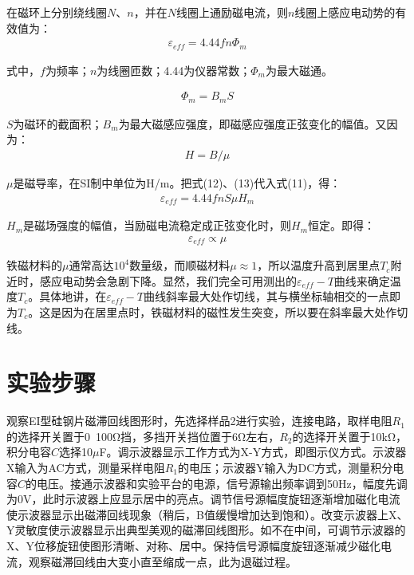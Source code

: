 ﻿\documentclass[12pt,a4paper]{article}
\begin{document}
在磁环上分别绕线圈$N$、$n$，并在$N$线圈上通励磁电流，则$n$线圈上感应电动势的有效值为：
\begin{align}
\varepsilon_{eff} = 4.44fn\Phi_m \tag{11}
\end{align}

式中，$f$为频率；$n$为线圈匝数；4.44为仪器常数；$\Phi_m$为最大磁通。

\begin{align}
\Phi_m = B_mS \tag{12}
\end{align}

$S$为磁环的截面积；$B_m$为最大磁感应强度，即磁感应强度正弦变化的幅值。又因为：
\begin{align}
H = B/\mu \tag{13}
\end{align}

$\mu$是磁导率，在SI制中单位为H/m。把式(12)、(13)代入式(11)，得：
\begin{align}
\varepsilon_{eff} = 4.44fnS\mu H_m \tag{14}
\end{align}

$H_m$是磁场强度的幅值，当励磁电流稳定成正弦变化时，则$H_m$恒定。即得：
\begin{align}
\varepsilon_{eff} \propto \mu \tag{15}
\end{align}

铁磁材料的$\mu$通常高达$10^4$数量级，而顺磁材料$\mu \approx 1$，所以温度升高到居里点$T_c$附近时，感应电动势会急剧下降。显然，我们完全可用测出的$\varepsilon_{eff}-T$曲线来确定温度$T_c$。具体地讲，在$\varepsilon_{eff}-T$曲线斜率最大处作切线，其与横坐标轴相交的一点即为$T_c$。这是因为在居里点时，铁磁材料的磁性发生突变，所以要在斜率最大处作切线。

\section{实验步骤}

观察EI型硅钢片磁滞回线图形时，先选择样品2进行实验，连接电路，取样电阻$R_1$的选择开关置于0~100Ω挡，多挡开关挡位置于6Ω左右，$R_2$的选择开关置于10kΩ，积分电容$C$选择10$\mu$F。调示波器显示工作方式为X-Y方式，即图示仪方式。示波器X输入为AC方式，测量采样电阻$R_1$的电压；示波器Y输入为DC方式，测量积分电容$C$的电压。接通示波器和实验平台的电源，信号源输出频率调到50Hz，幅度先调为0V，此时示波器上应显示居中的亮点。调节信号源幅度旋钮逐渐增加磁化电流使示波器显示出磁滞回线现象（稍后，B值缓慢增加达到饱和）。改变示波器上X、Y灵敏度使示波器显示出典型美观的磁滞回线图形。如不在中间，可调节示波器的X、Y位移旋钮使图形清晰、对称、居中。保持信号源幅度旋钮逐渐减少磁化电流，观察磁滞回线由大变小直至缩成一点，此为退磁过程。
\end{document}
